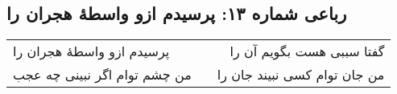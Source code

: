 \begin{center}
\section*{رباعی شماره ۱۳: پرسیدم ازو واسطهٔ هجران را}
\label{sec:sh013}
\begin{longtable}{l p{0.5cm} r}
پرسیدم ازو واسطهٔ هجران را
&&
گفتا سببی هست بگویم آن را
\\
من چشم توام اگر نبینی چه عجب
&&
من جان توام کسی نبیند جان را
\\
\end{longtable}
\end{center}
